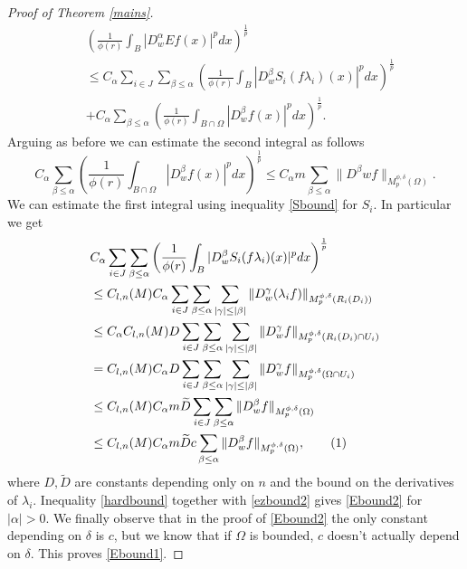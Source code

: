 \documentclass[12pt]{article}
\theoremstyle{definition}
\newcommand\addtag{\refstepcounter{equation}\tag{\theequation}}
\begin{document}
\begin{proof}[Proof of Theorem \ref{mains}]
\begin{align*}
&\left( \frac{1}{\phi(r)} \int_B |D^\alpha_w Ef(x)|^pdx \right)^\frac{1}{p} \\
&\le C_\alpha\sum_{i\in J}\sum_{\beta\le \alpha}  \left( \frac{1}{\phi(r)} \int_B |D^\beta_wS_i(f\lambda_i)(x)|^pdx \right)^\frac{1}{p} \\
&+C_\alpha \sum_{\beta\le \alpha}  \left( \frac{1}{\phi(r)} \int_{B\cap\Omega} |D^\beta_w f(x)|^pdx \right)^\frac{1}{p}.
\end{align*}
Arguing as before we can estimate the second integral as follows
\begin{equation}
C_\alpha \sum_{\beta\le \alpha}  \left( \frac{1}{\phi(r)} \int_{B\cap\Omega} |D^\beta_w f(x)|^pdx \right)^\frac{1}{p}\le  C_\alpha m\sum_{\beta\le \alpha}  \| D^\beta wf\|_{M_p^{\phi,\delta}(\Omega)}. \label{ezbound2}
\end{equation}
We can estimate the first integral using inequality \eqref{Sbound} for $S_i$. In particular we get
\begin{align*}
&C_\alpha\sum_{i\in J}\sum_{\beta\le \alpha}  \left( \frac{1}{\phi(r)} \int_B |D^\beta_wS_i(f\lambda_i)(x)|^pdx \right)^\frac{1}{p} \\
& \le C_{l,n}(M) C_\alpha\sum_{i\in J}\sum_{\beta\le \alpha}\sum_{|\gamma|\le |\beta|} \| D^\gamma_w(\lambda_if)\|_{M_p^{\phi,\delta}(R_i(D_i))} \\
&\le C_\alpha C_{l,n}(M) D\sum_{i\in J}\sum_{\beta\le \alpha}\sum_{|\gamma|\le |\beta|} \| D^\gamma_wf\|_{M_p^{\phi,\delta}(R_i(D_i)\cap U_i)} \\
&= C_{l,n}(M)C_\alpha D\sum_{i\in J}\sum_{\beta\le \alpha}\sum_{|\gamma|\le |\beta|} \| D^\gamma_wf\|_{M_p^{\phi,\delta}(\Omega\cap U_i)} \\
&\le C_{l,n}(M)C_\alpha m \widetilde D\sum_{i\in J} \sum_{\beta\le \alpha}\| D^\beta_wf\|_{M_p^{\phi,\delta}(\Omega)} \\
&\le C_{l,n}(M) C_\alpha m \widetilde Dc\sum_{\beta\le \alpha}\| D^\beta_wf\|_{M_p^{\phi,\delta}(\Omega)}, \addtag \label{hardbound}
\end{align*}
where $D,\widetilde D$ are constants depending only on $n$ and the bound on the derivatives of $\lambda_i.$ Inequality \eqref{hardbound} together with \eqref{ezbound2} gives \eqref{Ebound2} for $|\alpha|>0.$ We finally observe that in the proof of \eqref{Ebound2} the only constant depending on $\delta$ is $c$, but we know that if $\Omega$ is bounded, $c$ doesn't actually depend on $\delta$. This proves \eqref{Ebound1}.

\end{proof}


\end{document}
